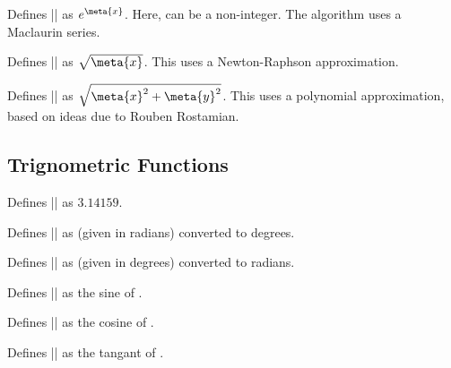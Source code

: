 \begin{command}{\pgfmathexp{}}                
	Defines |\pgfmathresult| as $e^{\meta{x}}$. Here,  can be a 
	non-integer. The algorithm	uses a Maclaurin series.               
\end{command}
	
\begin{command}{\pgfmathsqrt{}} 
	Defines |\pgfmathresult| as $\sqrt{\meta{x}}$. This uses a 
	Newton-Raphson approximation. 
\end{command}
	
\begin{command}{\pgfmathveclen{}}        
	Defines |\pgfmathresult| as $\sqrt{\meta{x}^2+\meta{y}^2}$. This uses
	a polynomial approximation, based on ideas due to Rouben Rostamian.                                    
\end{command}

\subsection{Trignometric Functions}

\label{pgfmath-trigonmetry}

\begin{command}{\pgfmathpi}
  	Defines |\pgfmathresult| as $3.14159$.
\end{command}
   
\begin{command}{} 
	Defines |\pgfmathresult| as  (given in radians) converted to 
	degrees. 
\end{command}

\begin{command}{} 
	Defines |\pgfmathresult| as  (given in degrees) converted to 
	radians. 
\end{command}

\begin{command}{}  
	Defines |\pgfmathresult| as the sine of .  
\end{command}

\begin{command}{}
	Defines |\pgfmathresult| as the cosine of .
\end{command}

\begin{command}{}  
	Defines |\pgfmathresult| as the tangant of .  
\end{command}

